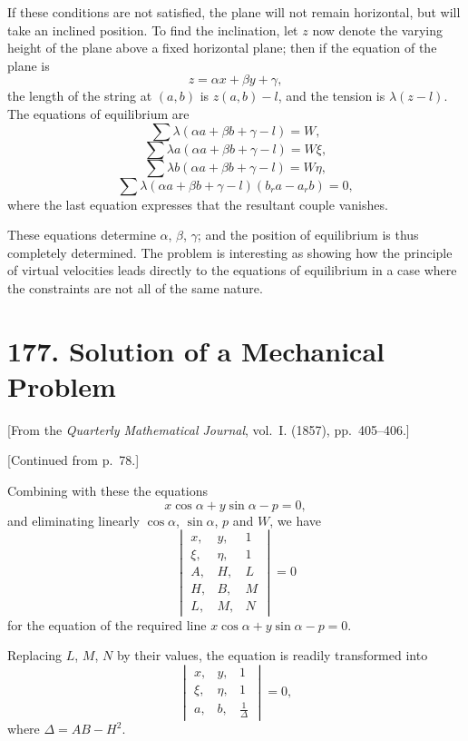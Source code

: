 \documentclass[11pt,a4paper]{book}
\begin{document}
If these conditions are not satisfied, the plane will not remain horizontal, but will take an inclined position. To find the inclination, let $z$ now denote the varying height of the plane above a fixed horizontal plane; then if the equation of the plane is
\[
z = \alpha x + \beta y + \gamma,
\]
the length of the string at $(a,b)$ is $z(a,b)-l$, and the tension is $\lambda(z-l)$. The equations of equilibrium are
\[
\sum \lambda(\alpha a + \beta b + \gamma - l) = W,
\]
\[
\sum \lambda a(\alpha a + \beta b + \gamma - l) = W\xi,
\]
\[
\sum \lambda b(\alpha a + \beta b + \gamma - l) = W\eta,
\]
\[
\sum \lambda(\alpha a + \beta b + \gamma - l)(b_r a - a_r b) = 0,
\]
where the last equation expresses that the resultant couple vanishes.

These equations determine $\alpha$, $\beta$, $\gamma$; and the position of equilibrium is thus completely determined. The problem is interesting as showing how the principle of virtual velocities leads directly to the equations of equilibrium in a case where the constraints are not all of the same nature.
\clearpage


\newpage


\section*{177. Solution of a Mechanical Problem}

[From the \textit{Quarterly Mathematical Journal}, vol.~I. (1857), pp.~405--406.]

[Continued from p.~78.]

Combining with these the equations
\[
x \cos \alpha + y \sin \alpha - p = 0,
\]
and eliminating linearly $\cos \alpha$, $\sin \alpha$, $p$ and $W$, we have
\[
\begin{vmatrix}
x, & y, & 1 \\
\xi, & \eta, & 1 \\
A, & H, & L \\
H, & B, & M \\
L, & M, & N
\end{vmatrix} = 0
\]
for the equation of the required line $x \cos \alpha + y \sin \alpha - p = 0$.

Replacing $L$, $M$, $N$ by their values, the equation is readily transformed into
\[
\begin{vmatrix}
x, & y, & 1 \\
\xi, & \eta, & 1 \\
a, & b, & \frac{1}{\Delta}
\end{vmatrix} = 0,
\]
where $\Delta = AB - H^2$.
\end{document}
